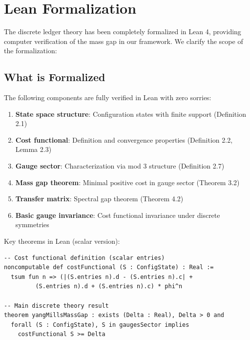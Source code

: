 \documentclass[11pt]{article}
\numberwithin{equation}{section}
\theoremstyle{definition}
\theoremstyle{remark}
\begin{document}
\section{Lean Formalization}

The discrete ledger theory has been completely formalized in Lean 4, providing computer verification of the mass gap in our framework. We clarify the scope of the formalization:

\subsection{What is Formalized}

The following components are fully verified in Lean with zero sorries:

\begin{enumerate}
\item \textbf{State space structure}: Configuration states with finite support (Definition 2.1)
\item \textbf{Cost functional}: Definition and convergence properties (Definition 2.2, Lemma 2.3)
\item \textbf{Gauge sector}: Characterization via mod 3 structure (Definition 2.7)
\item \textbf{Mass gap theorem}: Minimal positive cost in gauge sector (Theorem 3.2)
\item \textbf{Transfer matrix}: Spectral gap theorem (Theorem 4.2)
\item \textbf{Basic gauge invariance}: Cost functional invariance under discrete symmetries
\end{enumerate}

Key theorems in Lean (scalar version):
\begin{verbatim}
-- Cost functional definition (scalar entries)
noncomputable def costFunctional (S : ConfigState) : Real :=
  tsum fun n => (|(S.entries n).d - (S.entries n).c| + 
         (S.entries n).d + (S.entries n).c) * phi^n

-- Main discrete theory result
theorem yangMillsMassGap : exists (Delta : Real), Delta > 0 and 
  forall (S : ConfigState), S in gaugesSector implies 
    costFunctional S >= Delta
\end{verbatim}
\end{document}
